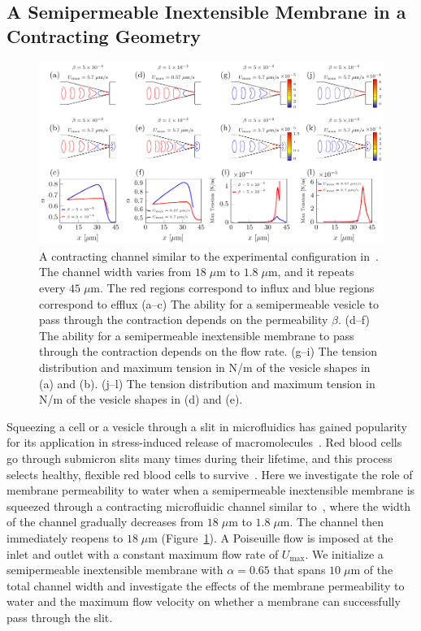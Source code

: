 \documentclass[prb,preprint,showpacs,preprintnumbers,amsmath,amssymb,longbibliography]{revtex4-1}
\newif\ifTikz
\begin{document}
\subsection{A Semipermeable Inextensible Membrane in a Contracting Geometry} 
\begin{figure}[htp]
  \centering
    \centering
  \ifTikz
  
  \else
  \includegraphics{figures/contractingComposite.pdf}
  \fi
  \caption{\label{fig:contractingComposite} A contracting channel
  similar to the experimental configuration in~\citet{wu2015critical}.
  The channel width varies from $18\;\mu$m to $1.8\;\mu$m, and it
  repeats every $45\;\mu$m. The red regions correspond to influx and
  blue regions correspond to efflux (a--c) The ability for a
  semipermeable vesicle to pass through the contraction depends on the
  permeability $\beta$. (d--f) The ability for a semipermeable
  inextensible membrane to pass through the contraction depends on the
  flow rate. (g--i) The tension distribution and maximum tension in N/m
  of the vesicle shapes in (a) and (b).  (j--l) The tension distribution
  and maximum tension in N/m of the vesicle shapes in (d) and (e).}
\end{figure}

Squeezing a cell or a vesicle through a slit in microfluidics
has gained popularity for its application in stress-induced release of
macromolecules~\cite{ShareiEtAl2013_PNAS, Pak2015_PNAS,
ZhangShenHoganBarakatMisbah2018_BJ, LuoBai2019_PoF}. Red blood cells go
through submicron slits many times during their lifetime, and this
process selects healthy, flexible red blood cells to
survive~\cite{wu2015critical,LuPeng2019_PoF}. Here we investigate the
role of membrane permeability to water when a semipermeable inextensible membrane is
squeezed through a contracting microfluidic channel similar
to~\citet{wu2015critical}, where the width of the channel gradually
decreases from $18 \;\mu$m to $1.8\; \mu$m. The channel then immediately
reopens to $18\;\mu$m (Figure~\ref{fig:contractingComposite}). A
Poiseuille flow is imposed at the inlet and outlet with a constant
maximum flow rate of $U_{\max}$. We initialize a semipermeable inextensible membrane
with $\alpha = 0.65$ that spans $10\; \mu$m of the total channel width
and investigate the effects of the membrane permeability to water and
the maximum flow velocity on whether a membrane can successfully pass
through the slit. 
\end{document}
